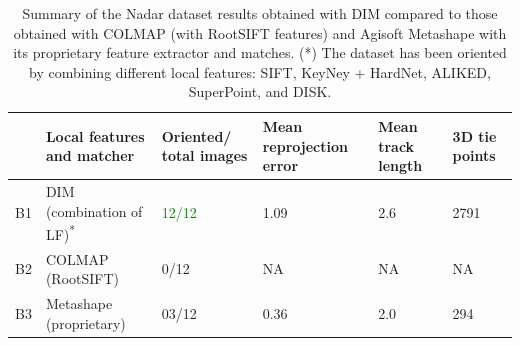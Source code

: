 \begin{table}
    \centering
    \caption{Summary of the Nadar dataset results obtained with DIM compared to those obtained with COLMAP (with RootSIFT features) and Agisoft Metashape with its proprietary feature extractor and matches. (*) The dataset has been oriented by combining different local features: SIFT, KeyNey + HardNet, ALIKED, SuperPoint, and DISK.} 
    \label{tab:5:nadar_summary}
    
    \begin{tabular}{l p{3.5cm} p{2.2cm} p{2.2cm} p{2.2cm} p{2.2cm}}
    \toprule
    &Local features \newline and matcher & Oriented/ \newline total images & Mean reprojection error \newline [px] & Mean track \newline length &  3D tie points\\
    \midrule
    B1 &DIM \newline (combination of LF)\textsuperscript{*}    & \textcolor{green}{12/12}     & 1.09  & 2.6   & 2791 \\
    B2 &COLMAP \newline(RootSIFT)                     & 0/12      & NA    & NA    & NA   \\
    B3 &Metashape \newline (proprietary)              & 03/12     & 0.36  & 2.0   & 294  \\
    \bottomrule
    \end{tabular}
\end{table}



